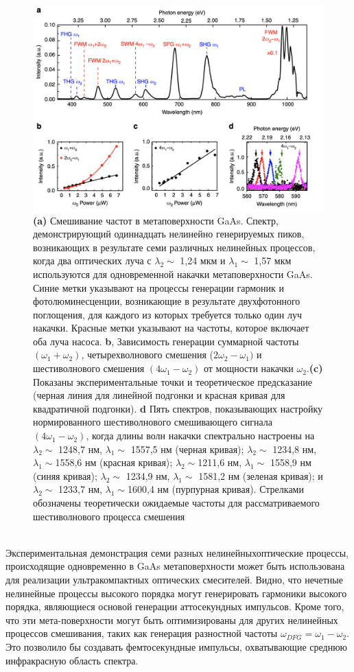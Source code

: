 \begin{figure}[h!]
	\centering
	\includegraphics[width=0.8\linewidth]{images/mixer1.png}
	\caption{\textbf{(a)} Смешивание частот в метаповерхности GaAs. Спектр, демонстрирующий одиннадцать нелинейно генерируемых пиков, возникающих в результате семи различных нелинейных процессов, когда два оптических луча с  $\lambda_2 \sim$ 1,24 мкм и  $\lambda_1 \sim$ 1,57 мкм используются для одновременной накачки метаповерхности GaAs. Синие метки указывают на процессы генерации гармоник и фотолюминесценции, возникающие в результате двухфотонного поглощения, для каждого из которых требуется только один луч накачки. Красные метки указывают на частоты, которое включает оба луча насоса. \textbf{b}, Зависимость генерации суммарной частоты $(\omega_1 + \omega_2)$, четырехволнового смешения ($2\omega_2 - \omega_1)$ и шестиволнового смешения $(4\omega_1 - \omega_2)$ от мощности накачки $\omega_2$.\textbf{(c) } Показаны экспериментальные  точки и теоретическое предсказание (черная линия для линейной подгонки и красная кривая для квадратичной подгонки). \textbf{d} Пять спектров, показывающих настройку нормированного шестиволнового смешивающего сигнала $(4\omega_1 - \omega_2)$, когда длины волн накачки спектрально настроены на $\lambda_2 \sim$ 1248,7 нм,  $\lambda_1 \sim$ 1557,5 нм (черная кривая); $\lambda_2 \sim$ 1234,8 нм, $\lambda_1 \sim$1558,6 нм (красная кривая); $\lambda_2 \sim$1211,6 нм, $\lambda_1 \sim$ 1558,9 нм (синяя кривая); $\lambda_2 \sim$ 1234,9 нм, $\lambda_1 \sim$ 1581,2 нм (зеленая кривая); и $\lambda_2 \sim$ 1233,7 нм, $\lambda_1 \sim$1600,4 нм (пурпурная кривая). Стрелками обозначены теоретически ожидаемые частоты для рассматриваемого шестиволнового процесса смешения}
	\label{mixerPictr2}
\end{figure}
\\
Экспериментальная демонстрация семи разных нелинейныхоптические процессы, происходящие одновременно в GaAs метаповерхности может быть использована для реализации ультракомпактных оптических смесителей. Видно, что нечетные нелинейные процессы высокого порядка могут генерировать гармоники высокого порядка, являющиеся основой генерации аттосекундных импульсов. Кроме того, что эти мета-поверхности могут быть оптимизированы для других нелинейных процессов смешивания, таких как генерация разностной частоты $\omega_{DFG} = \omega_1 - \omega_2$. Это позволило бы создавать фемтосекундные импульсы, охватывающие среднюю инфракрасную область спектра. 
